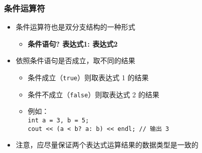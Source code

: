 \begin{frame}[fragile]
    \frametitle{条件运算符}

    \begin{itemize}[<+->]
        \item 条件运算符也是双分支结构的一种形式

            \begin{itemize}
                \item \textbf{条件语句? \enspace 表达式1: \enspace 表达式2}
            \end{itemize}

        \item 依照条件语句是否成立，取不同的结果 

            \begin{itemize}
                \item 条件成立（\lstinline|true|）则取表达式 1 的结果
                \item 条件不成立（\lstinline|false|）则取表达式 2 的结果
                \item 例如：\\
                    \lstinline|int a = 3, b = 5;|\\
                    \lstinline{cout << (a < b? a: b) << endl; // 输出 3}
            \end{itemize}

        \item 注意，应尽量保证两个表达式运算结果的数据类型是一致的
    \end{itemize}
\end{frame}

